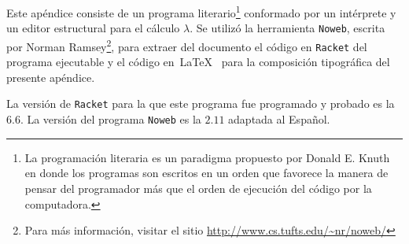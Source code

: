 Este apéndice consiste de un programa literario\footnote{La programación literaria es un paradigma propuesto por Donald E. Knuth en donde los programas son escritos en un orden que favorece la manera de pensar del programador más que el orden de ejecución del código por la computadora.} conformado por un intérprete y un editor estructural para el cálculo \( λ \). Se utilizó la herramienta \texttt{Noweb}, escrita por Norman Ramsey\footnote{Para más información, visitar el sitio \url{http://www.cs.tufts.edu/~nr/noweb/}}, para extraer del documento el código en \texttt{Racket} del programa ejecutable y el código en~\LaTeX~ para la composición tipográfica del presente apéndice.

La versión de \texttt{Racket} para la que este programa fue programado y probado es la \( 6.6 \). La versión del programa \texttt{Noweb} es la \( 2.11 \) adaptada al Español.
